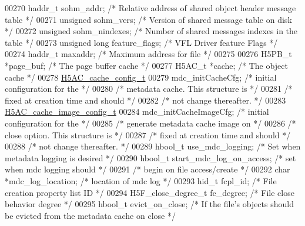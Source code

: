 \begin{DoxyCode}
00270     haddr\_t sohm\_addr;  \textcolor{comment}{/* Relative address of shared object header message table */}
00271     \textcolor{keywordtype}{unsigned}    sohm\_vers;  \textcolor{comment}{/* Version of shared message table on disk */}
00272     \textcolor{keywordtype}{unsigned}    sohm\_nindexes;  \textcolor{comment}{/* Number of shared messages indexes in the table */}
00273     \textcolor{keywordtype}{unsigned} \textcolor{keywordtype}{long} feature\_flags; \textcolor{comment}{/* VFL Driver feature Flags            */}
00274     haddr\_t maxaddr;    \textcolor{comment}{/* Maximum address for file             */}
00275 
00276     H5PB\_t      *page\_buf;                  \textcolor{comment}{/* The page buffer cache                */}
00277     H5AC\_t      *cache;     \textcolor{comment}{/* The object cache         */}
00278     \hyperlink{struct_h5_a_c__cache__config__t}{H5AC\_cache\_config\_t}
00279         mdc\_initCacheCfg; \textcolor{comment}{/* initial configuration for the      */}
00280                                 \textcolor{comment}{/* metadata cache.  This structure is   */}
00281                                 \textcolor{comment}{/* fixed at creation time and should    */}
00282                                 \textcolor{comment}{/* not change thereafter.               */}
00283     \hyperlink{struct_h5_a_c__cache__image__config__t}{H5AC\_cache\_image\_config\_t} 
00284         mdc\_initCacheImageCfg;  \textcolor{comment}{/* initial configuration for the */}
00285                                         \textcolor{comment}{/* generate metadata cache image on     */}
00286                                         \textcolor{comment}{/* close option.  This structure is     */}
00287                                         \textcolor{comment}{/* fixed at creation time and should    */}
00288                                         \textcolor{comment}{/* not change thereafter.               */}
00289     hbool\_t     use\_mdc\_logging; \textcolor{comment}{/* Set when metadata logging is desired */}
00290     hbool\_t     start\_mdc\_log\_on\_access; \textcolor{comment}{/* set when mdc logging should  */}
00291                                 \textcolor{comment}{/* begin on file access/create          */}
00292     \textcolor{keywordtype}{char}        *mdc\_log\_location; \textcolor{comment}{/* location of mdc log               */}
00293     hid\_t       fcpl\_id;    \textcolor{comment}{/* File creation property list ID   */}
00294     H5F\_close\_degree\_t fc\_degree;   \textcolor{comment}{/* File close behavior degree   */}
00295     hbool\_t evict\_on\_close; \textcolor{comment}{/* If the file's objects should be evicted from the metadata cache on close */}

\end{DoxyCode}
